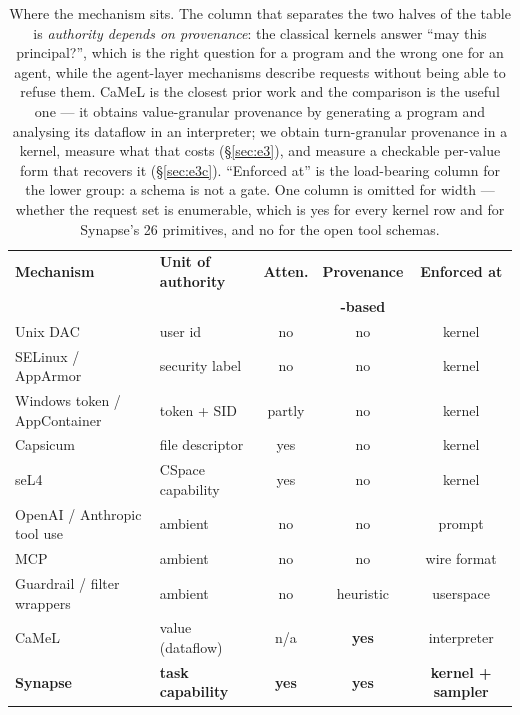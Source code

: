 \documentclass[11pt]{article}
\newcommand{\syn}{Synapse}
\begin{document}
\begin{table}[t]
\centering
\small
\begin{tabular}{@{}llccc@{}}
\toprule
\textbf{Mechanism} & \textbf{Unit of authority} & \textbf{Atten.} & \textbf{Provenance} & \textbf{Enforced at} \\
 & & & \textbf{-based} & \\
\midrule
    Unix DAC & user id & no & no & kernel \\
    SELinux / AppArmor & security label & no & no & kernel \\
    Windows token / AppContainer & token + SID & partly & no & kernel \\
    Capsicum & file descriptor & yes & no & kernel \\
    seL4 & CSpace capability & yes & no & kernel \\
\midrule
    OpenAI / Anthropic tool use & ambient & no & no & prompt \\
    MCP & ambient & no & no & wire format \\
    Guardrail / filter wrappers & ambient & no & heuristic & userspace \\
    CaMeL~\cite{debenedetti2025camel} & value (dataflow) & n/a & \textbf{yes} & interpreter \\
\midrule
    \textbf{\syn{}} & \textbf{task capability} & \textbf{yes} & \textbf{yes} & \textbf{kernel + sampler} \\
\bottomrule
\end{tabular}
\caption{Where the mechanism sits. The column that separates the two halves of
the table is \emph{authority depends on provenance}: the classical kernels
answer ``may this principal?'', which is the right question for a program and
the wrong one for an agent, while the agent-layer mechanisms describe requests
without being able to refuse them. CaMeL is the closest prior work and the
comparison is the useful one --- it obtains value-granular provenance by
generating a program and analysing its dataflow in an interpreter; we obtain
turn-granular provenance in a kernel, measure what that costs
(\S\ref{sec:e3}), and measure a checkable per-value form that recovers it
(\S\ref{sec:e3c}). ``Enforced at'' is the load-bearing column for the lower
group: a schema is not a gate. One column is omitted for width --- whether the
request set is enumerable, which is yes for every kernel row and for \syn{}'s
26 primitives, and no for the open tool schemas.}
\label{tab:compare}
\end{table}
\end{document}

